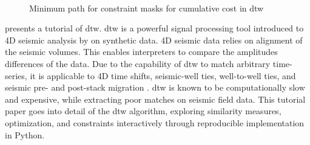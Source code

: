 \begin{figure}[!hb]
    ~
    ~
\caption{Minimum path for constraint masks for cumulative cost in \ac{dtw} \citep[from][]{dramsch2019dtw}}
\label{fig:constraints}
\end{figure} 
\citet{dramsch2019dtw} presents a tutorial of \acf{dtw}. \ac{dtw} is a powerful signal processing tool introduced to 4D seismic analysis by \citep{Hale2013} on synthetic data. 4D seismic data relies on alignment of the seismic volumes. This enables interpreters to compare the amplitudes differences of the data. Due to the capability of \ac{dtw} to match arbitrary time-series, it is applicable to 4D time shifts, seismic-well ties, well-to-well ties, and seismic pre- and post-stack migration \citep{Luo*2014}.  \ac{dtw} is known to be computationally slow and expensive, while extracting poor matches on seismic field data. This tutorial paper goes into detail of the \ac{dtw} algorithm, exploring similarity measures, optimization, and constraints interactively through reproducible implementation in Python.

